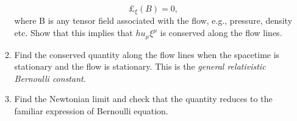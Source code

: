 \documentclass{article}
\begin{document}
\begin{enumerate}
\begin{enumerate}
    \begin{equation}
      \label{eq:symmetry-of-flow}
      \pounds_\xi(B) = 0,
    \end{equation}
    where B is any tensor field associated with the flow, e.g., pressure, density etc. Show that this implies that $h u_\mu \xi^\mu$ is conserved along the flow lines.
  \item Find the conserved quantity along the flow lines when the spacetime is stationary and the flow is stationary. This is the {\itshape general relativistic Bernoulli constant}.
  \item Find the Newtonian limit and check that the quantity reduces to the familiar expression of Bernoulli equation.
\end{enumerate}
  
\end{enumerate}
\end{document}
